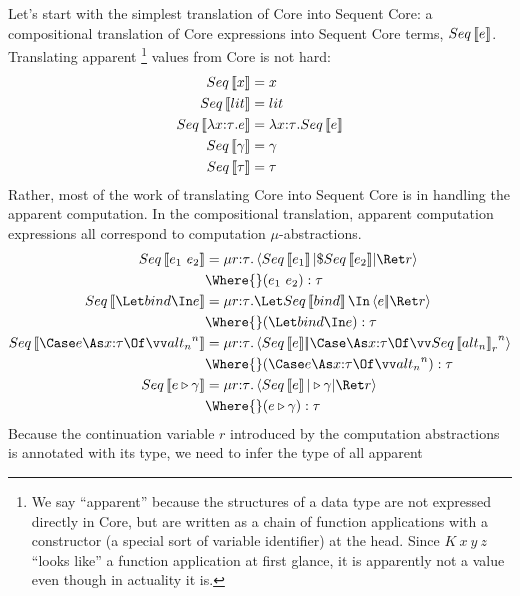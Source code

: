 \documentclass{article}
\begin{document}
Let's start with the simplest translation of Core into Sequent Core: a
compositional translation of Core expressions into Sequent Core terms,
$Seq\left\llbracket{e}\right\rrbracket$.  Translating apparent%
\footnote{We say ``apparent'' because the structures of a data type are not
  expressed directly in Core, but are written as a chain of function
  applications with a constructor (a special sort of variable identifier) at the
  head.  Since $K~x~y~z$ ``looks like'' a function application at first glance,
  it is apparently not a value even though in actuality it is.}
values from Core is not hard:
\begin{align*}
  Seq\left\llbracket{x}\right\rrbracket &= x
  \\
  Seq\left\llbracket{lit}\right\rrbracket &= lit
  \\
  Seq\left\llbracket{\lambda{x{:}{\tau}}. e}\right\rrbracket
  &=
  \lambda{x{:}{\tau}}. Seq\left\llbracket{e}\right\rrbracket
  \\
  Seq\left\llbracket{\gamma}\right\rrbracket &= \gamma
  \\
  Seq\left\llbracket{\tau}\right\rrbracket &= \tau
\end{align*}
Rather, most of the work of translating Core into Sequent Core is in handling
the apparent computation.  In the compositional translation, apparent
computation expressions all correspond to computation $\mu$-abstractions.
\begin{align*}
  Seq\trans{\expr_1 ~ \expr_2}
  &=
  \comp{\ann r \ty}
    \braket
    { Seq\trans{\expr_1}
    | \appto{Seq\trans{\expr_2}}
    | \ret r }
  \\
  &
  \Where{}
    (\expr_1 ~ \expr_2) : \ty
  \\
  Seq\trans{\Let \abind \In \expr}
  &=
  \comp{\ann r \ty}\Let Seq\trans{\abind} \In \cut{\expr}{\ret r}
  \\
  &
  \Where{}
    (\Let \abind \In \expr) : \ty
  \\
  Seq\trans{\Case \expr \As \ann{x}{\ty} \Of \vect[n]{\analt_n}}
  &=
  \comp{\ann{r}{\ty}}
    \cut
    {Seq\trans{\expr}}
    {\caseas{\ann{x}{\ty}}{\vect[n]{Seq\trans{\analt_n}_{r}}}}
  \\
  &
  \Where{}
    (\Case \expr \As \ann{x}{\ty} \Of \vect[n]{\analt_n}) : \ty
  \\
  Seq\trans{\coerce{\expr}{\cn}}
  &=
  \comp{\ann{r}{\ty}}\braket{Seq\trans{\expr}|\castby{\cn}|\ret{r}}
  \\
  &
  \Where{}
    (\coerce{\expr}{\cn}) : \ty
\end{align*}
Because the continuation variable $r$ introduced by the computation abstractions
is annotated with its type, we need to infer the type of all apparent
\end{document}
